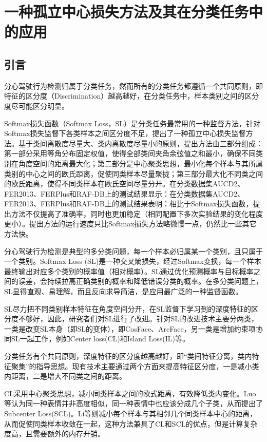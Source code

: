 \chapter{一种孤立中心损失方法及其在分类任务中的应用}


\section{引言}

分心驾驶行为检测归属于分类任务，然而所有的分类任务都遵循一个共同原则，即特征的区分度（Discrimination）越高越好，在分类任务中，样本类别之间的区分度尽可能区分明显。

Softmax损失函数（Softmax Loss，SL）是分类任务最常用的一种监督方法，针对Softmax损失监督下各类样本之间区分度不足，提出了一种孤立中心损失监督方法。基于类间离散度尽量大、类内离散度尽量小的原则，提出方法由三部分组成：第一部分采用等角分布固定权值，使得全部类间夹角余弦值之和最小，确保不同类别在角度空间的距离最大化；第二部分是中心聚类思想，最小化每个样本与其所属类别的中心之间的欧氏距离，促使同类样本尽量聚拢；第三部分最大化不同类之间的欧氏距离，使得不同类样本在欧氏空间尽量分开。在分类数据集AUCD2、FER2013、FERPlus和RAF-DB上的测试结果显示：在分类数据集AUCD2、FER2013、FERPlus和RAF-DB上的测试结果表明：相比于Softmax损失函数，提出方法不仅提高了准确率，同时也更加稳定（相同配置下多次实验结果的变化程度更小）。提出方法的运行速度只比Softmax损失方法略微慢一点，仍然比一些其它方法快。

分心驾驶行为检测是典型的多分类问题，每一个样本必归属某一个类别，且只属于一个类别。Softmax Loss (SL)是一种交叉熵损失，经过Softmax变换，每一个样本最终输出对应多个类别的概率值（相对概率）。SL通过优化预测概率与目标概率之间的误差，会持续拉高正确类别的概率和降低错误分类的概率。在多分类问题上，SL显得直观、易理解，而且反向求导简洁，是应用最广泛的一种监督函数。

SL尽力把不同类别样本特征在角度空间分开，在SL监督下学习到的深度特征的区分度不够好\cite{57}，因此，研究者们对SL进行了改进\cite{58,59,60}。针对SL的改进技术主要分两类，一类是改变SL本身（即SL的变体），即CosFace\cite{65}、ArcFace\cite{68}，另一类是增加约束项协同SL一起工作，例如Center loss(CL)\cite{63,64}和Island Loss(IL)\cite{69}等。

分类任务有个共同原则，深度特征的区分度越高越好，即“类间特征分离，类内特征聚集”的指导思想。现有技术主要通过两个方面来提高特征区分度，一是减小类内距离，二是增大不同类之间的距离。


CL采用中心聚类思想，减小同类样本之间的欧式距离，有效降低类内变化。Luo等\cite{61}认为同一种表情并非高度相似，同一种表情中也应该分成几个子类，从而提出了Subcenter Loss(SCL)。Li等\cite{61,62}则减小每个样本与其相邻几个同类样本中心的距离，从而促使同类样本收敛在一起，这种方法兼具了CL和SCL的优点，但是计算复杂度高，且需要额外的内存开销。

